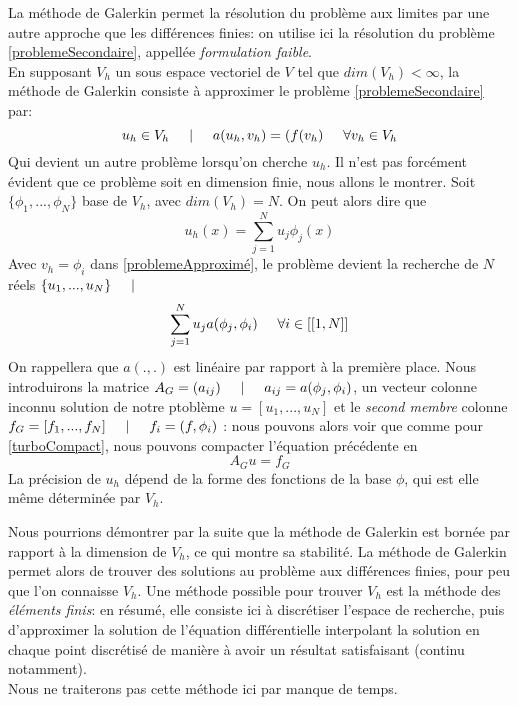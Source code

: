 \documentclass[12pt]{article}
\newcommand{\espace}{\hspace{5mm}}
\begin{document}
La méthode de Galerkin permet la résolution du problème aux limites par une autre approche que les différences finies: on utilise ici la résolution du problème \eqref{problemeSecondaire}, appellée \emph{formulation faible}.\\
En supposant $V_h$ un sous espace vectoriel de $V$ tel que $dim(V_h) < \infty$, la méthode de Galerkin consiste à approximer le problème \eqref{problemeSecondaire} par:
\begin{equation} \label{problemeApproximé}
u_h \in V_h \espace | \espace a(u_h, v_h) = (f(v_h) \espace \forall v_h \in V_h
\end{equation}
Qui devient un autre problème lorsqu'on cherche $u_h$.
Il n'est pas forcément évident que ce problème soit en dimension finie, nous allons le montrer. Soit $\{\phi_1, ..., \phi_N\}$ base de $V_h$, avec $dim(V_h) = N$. On peut alors dire que 
\begin{equation}
u_h(x) = \sum_{j = 1}^{N} u_j \phi_j(x)
\end{equation}
Avec $v_h = \phi_i$ dans \eqref{problemeApproximé}, le problème devient la recherche de $N$ réels $\{u_1, ..., u_N\} \espace |$
\begin{equation}
\sum_{j=1}^N u_j a(\phi_j, \phi_i) \espace \forall i \in [[1,N]]
\end{equation}
On rappellera que $a(.,.)$ est linéaire par rapport à la première place.
Nous introduirons la matrice $A_G = (a_{ij}) \espace | \espace a_{ij} = a(\phi_j, \phi_i)$, un vecteur colonne inconnu solution de notre ptoblème $u = [u_1, ..., u_N]$ et le \emph{second membre} colonne $f_G = [f_1, ..., f_N] \espace | \espace f_i = (f, \phi_i)$ : nous pouvons alors voir que comme pour \eqref{turboCompact}, nous pouvons compacter l'équation précédente en 
\begin{equation}
A_G u = f_G
\end{equation}
La précision de $u_h$ dépend de la forme des fonctions de la base $\phi$, qui est elle même déterminée par $V_h$.

Nous pourrions démontrer par la suite que la méthode de Galerkin est bornée par rapport à la dimension de $V_h$,  ce qui montre sa stabilité.
La méthode de Galerkin permet alors de trouver des solutions au problème aux différences finies, pour peu que l'on connaisse $V_h$. Une méthode possible pour trouver $V_h$ est la méthode des \emph{éléments finis}: en résumé, elle consiste ici à discrétiser l'espace de recherche, puis d'approximer la solution de l'équation différentielle interpolant la solution en chaque point discrétisé de manière à avoir un résultat satisfaisant (continu notamment).\\
Nous ne traiterons pas cette méthode ici par manque de temps.
\end{document}
